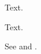 \documentclass{article}
\begin{document}
\begin{thm}\label{t1}Text.\end{thm}
\begin{lem}\label{l1}Text.\end{lem}
See  and .
\end{document}
